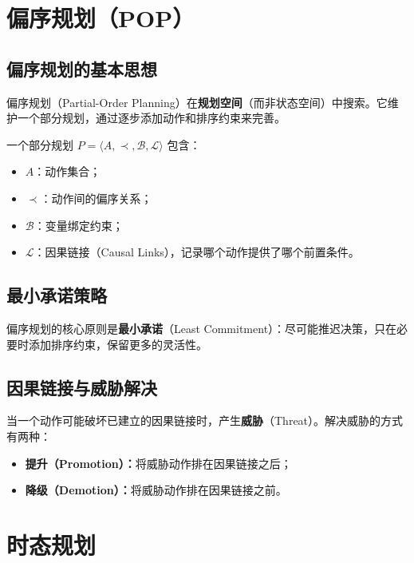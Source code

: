 \section{偏序规划（POP） \ug}

\subsection{偏序规划的基本思想}

偏序规划（Partial-Order Planning）在\textbf{规划空间}（而非状态空间）中搜索。它维护一个部分规划，通过逐步添加动作和排序约束来完善。

\begin{definition}[部分规划]
一个部分规划 $P = \langle A, \prec, \mathcal{B}, \mathcal{L} \rangle$ 包含：
\begin{itemize}
  \item $A$：动作集合；
  \item $\prec$：动作间的偏序关系；
  \item $\mathcal{B}$：变量绑定约束；
  \item $\mathcal{L}$：因果链接（Causal Links），记录哪个动作提供了哪个前置条件。
\end{itemize}
\end{definition}

\subsection{最小承诺策略}

偏序规划的核心原则是\textbf{最小承诺}（Least Commitment）：尽可能推迟决策，只在必要时添加排序约束，保留更多的灵活性。

\subsection{因果链接与威胁解决}

当一个动作可能破坏已建立的因果链接时，产生\textbf{威胁}（Threat）。解决威胁的方式有两种：
\begin{itemize}
  \item \textbf{提升（Promotion）：}将威胁动作排在因果链接之后；
  \item \textbf{降级（Demotion）：}将威胁动作排在因果链接之前。
\end{itemize}

\section{时态规划 \grad}

